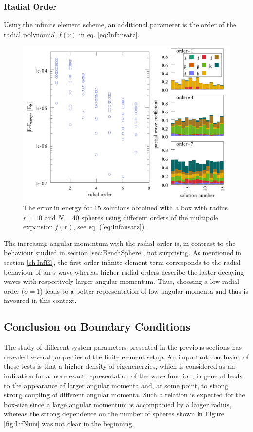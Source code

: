 \subsubsection{Radial Order}
Using the infinite element scheme, an additional parameter is the order of the radial polynomial $f(r)$ in eq. \ref{eq:Infansatz}.
\begin{figure}
\includegraphics[width=\textwidth]{Figures/BC/OrdInfEL}
\caption{The error in energy for $15$ solutions obtained with a box with radius $r=10$ and $N=40$ spheres using different orders of the multipole expansion $f(r)$, see eq. (\ref{eq:Infansatz}).}
\label{fig:InfOrd}
\end{figure}
The increasing angular momentum with the radial order is, in contrast to the behaviour studied in section \ref{sec:BenchSphere}, not surprising.
As mentioned in section \ref{ch:InfEl}, the  first order infinite element term corresponds to the radial behaviour of an $s$-wave whereas higher radial orders describe the faster decaying waves with respectively larger angular momentum.
Thus, choosing a low radial order ($o=1$) leads to a better representation of low angular momenta and thus is favoured in this context.

\subsection{Conclusion on Boundary Conditions}
The study of different system-parameters presented in the previous sections has revealed several properties of the finite element setup.
An important conclusion of these tests is that a higher density of eigenenergies, which is considered as an indication for a more exact representation of the wave function, in general leads to the appearance af larger angular momenta and, at some point, to strong strong coupling of different angular momenta.
Such a relation is expected for the box-size since a large angular momentum is accompanied by a larger radius, whereas the strong dependence on the number of spheres shown in Figure \ref{fig:InfNum} was not clear in the beginning.


